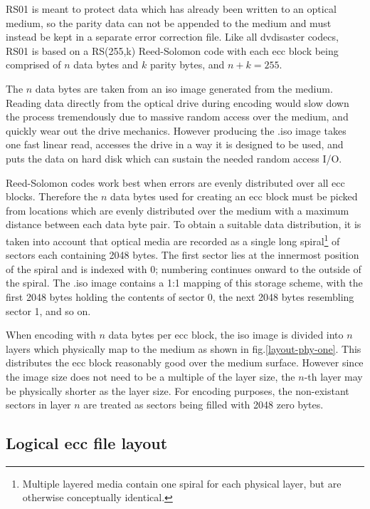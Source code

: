 RS01 is meant to protect data which has already been written to an optical
medium, so the parity data can not be appended to the medium and must instead 
be kept in a separate error correction file. Like all dvdisaster
codecs, RS01 is based on a RS(255,k) Reed-Solomon code with  each
ecc block being comprised of $n$ data bytes and $k$ parity bytes, and
$n+k=255$.

The $n$ data bytes are taken from an iso image generated from the medium.
Reading data directly from the optical drive during encoding would slow down the
process tremendously due to massive random access over the medium, and 
quickly wear out the drive mechanics. However producing the .iso image 
takes one fast linear read, accesses the drive in a way it is designed to be used,
and puts the data on hard disk which can sustain the needed random access I/O.

Reed-Solomon codes
work best when errors are evenly distributed over all ecc blocks.
Therefore the $n$ data bytes used for creating an ecc block must be picked from
locations which are evenly distributed over the medium with a maximum
distance between each data byte pair. To obtain a suitable data distribution,
it is taken  into account that optical media are recorded as a single long 
spiral\footnote{Multiple layered
media contain one spiral for each physical layer, but are otherwise conceptually
identical.} of sectors each containing 2048 bytes.
The first sector lies at the innermost position of the spiral and is indexed with 0;
numbering continues onward to the outside of the spiral. The .iso image
contains a 1:1 mapping of this storage scheme, with the first 2048 bytes
holding the contents of sector 0, the next 2048 bytes resembling sector 1, and so on.

When encoding with $n$ data bytes per ecc block, the iso image is divided into
$n$ layers which physically map to the medium as shown in fig.\ref{layout-phy-one}. 
This distributes the ecc block reasonably good over the medium surface.
However since the image size does not need
to be a multiple of the layer size, the $n$-th layer may be physically shorter
as the layer size. For encoding purposes, the non-existant sectors in layer
$n$ are treated as sectors being filled with 2048 zero bytes. 

\subsection{Logical ecc file layout}

